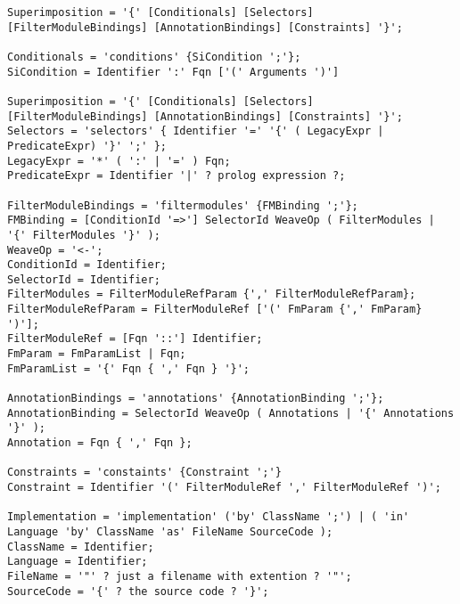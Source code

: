 \begin{lstlisting}[label=lst::proposedgrammar,style=listing,language=ebnf]
Superimposition = '{' [Conditionals] [Selectors] [FilterModuleBindings] [AnnotationBindings] [Constraints] '}';

Conditionals = 'conditions' {SiCondition ';'};
SiCondition = Identifier ':' Fqn ['(' Arguments ')']

Superimposition = '{' [Conditionals] [Selectors] [FilterModuleBindings] [AnnotationBindings] [Constraints] '}';
Selectors = 'selectors' { Identifier '=' '{' ( LegacyExpr | PredicateExpr) '}' ';' };
LegacyExpr = '*' ( ':' | '=' ) Fqn;
PredicateExpr = Identifier '|' ? prolog expression ?;

FilterModuleBindings = 'filtermodules' {FMBinding ';'};
FMBinding = [ConditionId '=>'] SelectorId WeaveOp ( FilterModules | '{' FilterModules '}' );
WeaveOp = '<-';
ConditionId = Identifier;
SelectorId = Identifier;
FilterModules = FilterModuleRefParam {',' FilterModuleRefParam};
FilterModuleRefParam = FilterModuleRef ['(' FmParam {',' FmParam} ')'];
FilterModuleRef = [Fqn '::'] Identifier;
FmParam = FmParamList | Fqn;
FmParamList = '{' Fqn { ',' Fqn } '}';

AnnotationBindings = 'annotations' {AnnotationBinding ';'};
AnnotationBinding = SelectorId WeaveOp ( Annotations | '{' Annotations '}' );
Annotation = Fqn { ',' Fqn };

Constraints = 'constaints' {Constraint ';'}
Constraint = Identifier '(' FilterModuleRef ',' FilterModuleRef ')';

Implementation = 'implementation' ('by' ClassName ';') | ( 'in' Language 'by' ClassName 'as' FileName SourceCode );
ClassName = Identifier;
Language = Identifier;
FileName = '"' ? just a filename with extention ? '"';
SourceCode = '{' ? the source code ? '}';

\end{lstlisting}
